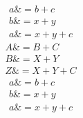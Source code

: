 \begin{equation*}
\begin{split}
a \&= b + c   \\
b \&= x + y  \\
a \&= x + y + c
\end{split}
\end{equation*}
\begin{equation}
\label{foo}
\begin{split}
A \&= B + C   \\
B \&= X + Y  \\
Z \&= X + Y + C
\end{split}
\end{equation}
\begin{equation}
\begin{split}
a \&= b + c   \\
b \&= x + y  \\
a \&= x + y + c
\end{split}
\end{equation}
